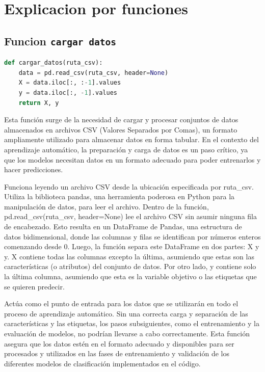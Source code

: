\documentclass[12pt]{article}
\begin{document}
\vspace{1cm}

\section*{Explicacion por funciones}
\vspace{1cm}
\subsection*{Funcion \texttt{cargar datos}}



\vspace{1cm}

\begin{lstlisting}[language=Python]
def cargar_datos(ruta_csv):
	data = pd.read_csv(ruta_csv, header=None)
	X = data.iloc[:, :-1].values
	y = data.iloc[:, -1].values
	return X, y


\end{lstlisting}
\vspace{1cm}

Esta función surge de la necesidad de cargar y procesar conjuntos de datos almacenados en archivos CSV (Valores Separados por Comas), un formato ampliamente utilizado para almacenar datos en forma tabular. En el contexto del aprendizaje automático, la preparación y carga de datos es un paso crítico, ya que los modelos necesitan datos en un formato adecuado para poder entrenarlos y hacer predicciones.\vspace{1cm}

Funciona leyendo un archivo CSV desde la ubicación especificada por ruta\_csv. Utiliza la biblioteca pandas, una herramienta poderosa en Python para la manipulación de datos, para leer el archivo. Dentro de la función, pd.read\_csv(ruta\_csv, header=None) lee el archivo CSV sin asumir ninguna fila de encabezado. Esto resulta en un DataFrame de Pandas, una estructura de datos bidimensional, donde las columnas y filas se identifican por números enteros comenzando desde 0. Luego, la función separa este DataFrame en dos partes: X y y. X contiene todas las columnas excepto la última, asumiendo que estas son las características (o atributos) del conjunto de datos. Por otro lado, y contiene solo la última columna, asumiendo que esta es la variable objetivo o las etiquetas que se quieren predecir.\vspace{1cm}

Actúa como el punto de entrada para los datos que se utilizarán en todo el proceso de aprendizaje automático. Sin una correcta carga y separación de las características y las etiquetas, los pasos subsiguientes, como el entrenamiento y la evaluación de modelos, no podrían llevarse a cabo correctamente. Esta función asegura que los datos estén en el formato adecuado y disponibles para ser procesados y utilizados en las fases de entrenamiento y validación de los diferentes modelos de clasificación implementados en el código.
\end{document}
